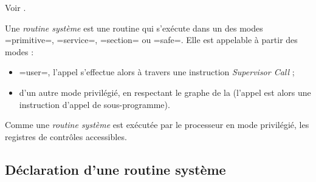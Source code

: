 
Voir .

%
%
%
%




















Une \emph{routine système} est une routine qui s'exécute dans un des modes \plm=primitive=, \plm=service=, \plm=section= ou \plm=safe=. Elle est appelable à partir des modes :
\begin{itemize}
 \item \plm=user=, l'appel s'effectue alors à travers une instruction \emph{Supervisor Call} ;
  \item d'un autre mode privilégié, en respectant le graphe de la  (l'appel est alors une instruction d'appel de sous-programme).
\end{itemize}

Comme une \emph{routine système} est exécutée par le processeur en mode privilégié, les registres de contrôles accessibles.




\subsection{Déclaration d'une routine système}


